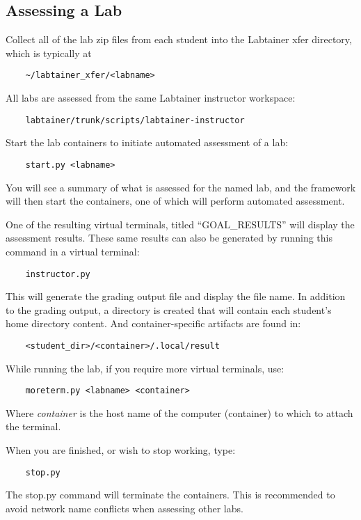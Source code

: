 \documentclass[12pt]{article}
\begin{document}
\subsection{Assessing a Lab}
Collect all of the lab zip files from each student into the Labtainer xfer directory, which
is typically at
\begin{verbatim}
    ~/labtainer_xfer/<labname>
\end{verbatim}
All labs are assessed from the same Labtainer instructor workspace:
\begin{verbatim}
    labtainer/trunk/scripts/labtainer-instructor
\end{verbatim}
\noindent Start the lab containers to initiate automated assessment of a lab:
\begin{verbatim}
    start.py <labname>
\end{verbatim}
\noindent You will see a summary of what is assessed for the named lab, and the framework
will then start the containers, one of which will perform automated assessment.

One of the resulting virtual terminals, titled ``GOAL\_RESULTS'' will display the assessment results.
These same results can also be generated by running this command in a virtual terminal:
\begin{verbatim}
    instructor.py
\end{verbatim}
\noindent This will generate the grading output file and display the file name.  In
addition to the grading output, a directory is created that will contain each student's
home directory content.  And container-specific artifacts are found in:
\begin{verbatim}
    <student_dir>/<container>/.local/result
\end{verbatim}

\noindent While running the lab, if you require more virtual terminals, use:
\begin{verbatim}
    moreterm.py <labname> <container>
\end{verbatim}
\noindent Where \textit{container} is the host name of the computer (container) to which to attach the terminal.

\noindent When you are finished, or wish to stop working, type:
\begin{verbatim}
    stop.py 
\end{verbatim}
The stop.py command will terminate the containers.  This is recommended to avoid network
name conflicts when assessing other labs.
\end{document}
